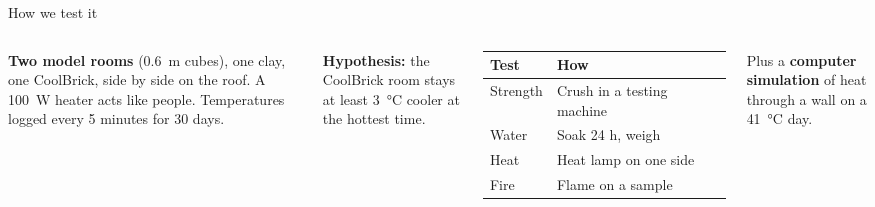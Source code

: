 \documentclass[aspectratio=169,10pt]{beamer}
\begin{document}
\begin{frame}{How we test it}
\begin{columns}[T]
\textbf{Two model rooms} (\SI{0.6}{m} cubes), one clay, one CoolBrick, side by side on the roof. A \SI{100}{W} heater acts like people. Temperatures logged every 5 minutes for 30 days.

\medskip
\textbf{Hypothesis:} the CoolBrick room stays at least \SI{3}{\celsius} cooler at the hottest time.
\small
\begin{tabular}{@{}ll@{}}
\toprule
Test & How \\
\midrule
Strength & Crush in a testing machine \\
Water & Soak 24 h, weigh \\
Heat & Heat lamp on one side \\
Fire & Flame on a sample \\
\bottomrule
\end{tabular}

\medskip
Plus a \textbf{computer simulation} of heat through a wall on a \SI{41}{\celsius} day.
\end{columns}
\end{frame}
\end{document}
